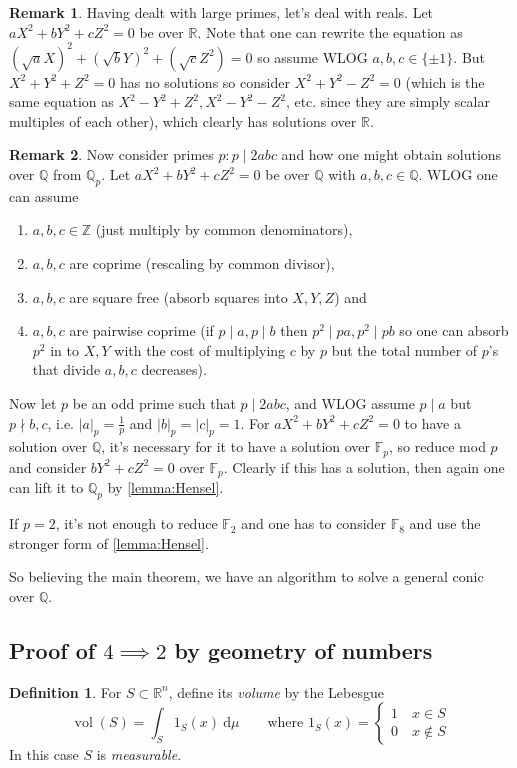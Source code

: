 \documentclass{article}
\newcommand{\F}{\mathbb{F}}
\newcommand{\Z}{\mathbb{Z}}
\newcommand{\Q}{\mathbb{Q}}
\newcommand{\R}{\mathbb{R}}
\newcommand{\vol}{\operatorname{vol}}
\theoremstyle{definition}
\newtheorem{defn}{Definition}[subsection]
\newtheorem*{remark}{Remark}
\begin{document}
\begin{remark}
Having dealt with large primes, let's deal with reals. Let $aX^2+bY^2+cZ^2=0$ be over $\R$. Note that one can rewrite the equation as $(\sqrt a X)^2+(\sqrt b Y)^2+(\sqrt c Z^2)=0$ so assume WLOG $a,b,c\in\{\pm 1\}$. But $X^2+Y^2+Z^2=0$ has no solutions so consider $X^2+Y^2-Z^2=0$ (which is the same equation as $X^2-Y^2+Z^2,X^2-Y^2-Z^2$, etc. since they are simply scalar multiples of each other), which clearly has solutions over $\R$.
\end{remark}

\begin{remark}
Now consider primes $p:p\mid 2abc$ and how one might obtain solutions over $\Q$ from $\Q_p$. Let $aX^2+bY^2+cZ^2=0$ be over $\Q$ with $a,b,c\in\Q$. WLOG one can assume
\begin{enumerate}
\item $a,b,c\in\Z$ (just multiply by common denominators),
\item $a,b,c$ are coprime (rescaling by common divisor),
\item $a,b,c$ are square free (absorb squares into $X,Y,Z$) and
\item $a,b,c$ are pairwise coprime (if $p\mid a,p\mid b$ then $p^2\mid pa,p^2\mid pb$ so one can absorb $p^2$ in to $X,Y$ with the cost of multiplying $c$ by $p$ but the total number of $p$'s that divide $a,b,c$ decreases).
\end{enumerate}
Now let $p$ be an odd prime such that $p\mid 2abc$, and WLOG assume $p\mid a$ but $p\nmid b,c$, i.e. $|a|_p=\frac{1}{p}$ and $|b|_p=|c|_p=1$. For $aX^2+bY^2+cZ^2=0$ to have a solution over $\Q$, it's necessary for it to have a solution over $\F_p$, so reduce mod $p$ and consider $bY^2+cZ^2=0$ over $\F_p$. Clearly if this has a solution, then again one can lift it to $\Q_p$ by \ref{lemma:Hensel}.

If $p=2$, it's not enough to reduce $\F_2$ and one has to consider $\F_8$ and use the stronger form of \ref{lemma:Hensel}.

So believing the main theorem, we have an algorithm to solve a general conic over $\Q$.
\end{remark}

\subsection{Proof of $4\implies 2$ by geometry of numbers}
\begin{defn}
For $S\subset\R^n$, define its \textit{volume} by the Lebesgue
\[
\vol(S)=\int_S 1_S(x)\ \mathrm d\mu \qquad \text{where }1_S(x)=\left\{\begin{aligned}
1 \quad x\in S \\
0 \quad x\notin S
\end{aligned} \right.
\]
In this case $S$ is \textit{measurable}.
\end{defn}
\end{document}
